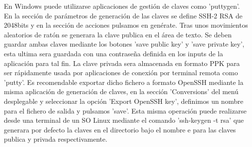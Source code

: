 En Windows puede utilizarse aplicaciones de gestión de claves como 'puttygen'. En la sección de parámetros de generación de las claves se define SSH-2 RSA de 2048bits y en la sección de acciones pulsamos en genérate. Tras unos movimientos aleatorios de ratón se generara la clave publica en el área de texto. Se deben guardar ambas claves mediante los botones 'save public key' y 'save private key', esta ultima sera guardada con una contraseña definida en los inputs de la aplicación para tal fin. La clave privada sera almacenada en formato PPK para ser rápidamente usada por aplicaciones de conexión por terminal remota como 'putty'. Es recomendable exportar dicho fichero a formato OpenSSH mediante la misma aplicación de generación de claves, en la sección 'Conversions' del menú desplegable y seleccionar la opción 'Export OpenSSH key', definimos  un nombre para el fichero de salida y pulsamos 'save'. Esta misma operación puede realizarse desde una terminal de un SO Linux mediante el comando 'ssh-keygen -t rsa' que generara por defecto la claves en el directorio  bajo el nombre  e  para las claves publica y privada respectivamente.

